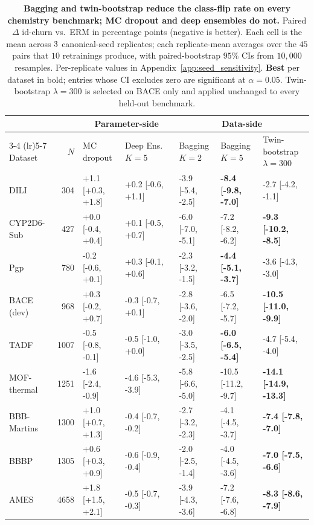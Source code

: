 \begin{table}[t]
  \centering
  \caption{\textbf{Bagging and twin-bootstrap reduce the class-flip rate on every chemistry benchmark; MC dropout and deep ensembles do not.}  Paired $\Delta$ id-churn vs.\ ERM in percentage points (negative is better).  Each cell is the mean across $3$ canonical-seed replicates; each replicate-mean averages over the $45$ pairs that $10$ retrainings produce, with paired-bootstrap $95\%$ CIs from $10{,}000$ resamples.  Per-replicate values in Appendix~\ref{app:seed_sensitivity}.  \textbf{Best} per dataset in bold; entries whose CI excludes zero are significant at $\alpha{=}0.05$.  Twin-bootstrap $\lambda{=}300$ is selected on BACE only and applied unchanged to every held-out benchmark.}
  \label{tab:main}
  \scriptsize
  \begin{tabular}{lrll@{\hspace{1.2em}}lll}
    \toprule
    & & \multicolumn{2}{c}{Parameter-side} & \multicolumn{3}{c}{Data-side} \\
    \cmidrule(lr){3-4} \cmidrule(lr){5-7}
    Dataset & $N$ & MC dropout & Deep Ens.\ $K{=}5$ & Bagging $K{=}2$ & Bagging $K{=}5$ & Twin-bootstrap $\lambda{=}300$ \\
    \midrule
    DILI & 304 & +1.1 [+0.3, +1.8] & +0.2 [-0.6, +1.1] & -3.9 [-5.4, -2.5] & \textbf{-8.4 [-9.8, -7.0]} & -2.7 [-4.2, -1.1] \\
    CYP2D6-Sub & 427 & +0.0 [-0.4, +0.4] & +0.1 [-0.5, +0.7] & -6.0 [-7.0, -5.1] & -7.2 [-8.2, -6.2] & \textbf{-9.3 [-10.2, -8.5]} \\
    Pgp & 780 & -0.2 [-0.6, +0.1] & +0.3 [-0.1, +0.6] & -2.3 [-3.2, -1.5] & \textbf{-4.4 [-5.1, -3.7]} & -3.6 [-4.3, -3.0] \\
    BACE\,(dev) & 968 & +0.3 [-0.2, +0.7] & -0.3 [-0.7, +0.1] & -2.8 [-3.6, -2.0] & -6.5 [-7.2, -5.7] & \textbf{-10.5 [-11.0, -9.9]} \\
    TADF & 1007 & -0.5 [-0.8, -0.1] & -0.5 [-1.0, +0.0] & -3.0 [-3.5, -2.5] & \textbf{-6.0 [-6.5, -5.4]} & -4.7 [-5.4, -4.0] \\
    MOF-thermal & 1251 & -1.6 [-2.4, -0.9] & -4.6 [-5.3, -3.9] & -5.8 [-6.6, -5.0] & -10.5 [-11.2, -9.7] & \textbf{-14.1 [-14.9, -13.3]} \\
    BBB-Martins & 1300 & +1.0 [+0.7, +1.3] & -0.4 [-0.7, -0.2] & -2.7 [-3.2, -2.3] & -4.1 [-4.5, -3.7] & \textbf{-7.4 [-7.8, -7.0]} \\
    BBBP & 1305 & +0.6 [+0.3, +0.9] & -0.6 [-0.9, -0.4] & -2.0 [-2.5, -1.4] & -4.0 [-4.5, -3.6] & \textbf{-7.0 [-7.5, -6.6]} \\
    AMES & 4658 & +1.8 [+1.5, +2.1] & -0.5 [-0.7, -0.3] & -3.9 [-4.3, -3.6] & -7.2 [-7.6, -6.8] & \textbf{-8.3 [-8.6, -7.9]} \\
    \bottomrule
  \end{tabular}
\end{table}
